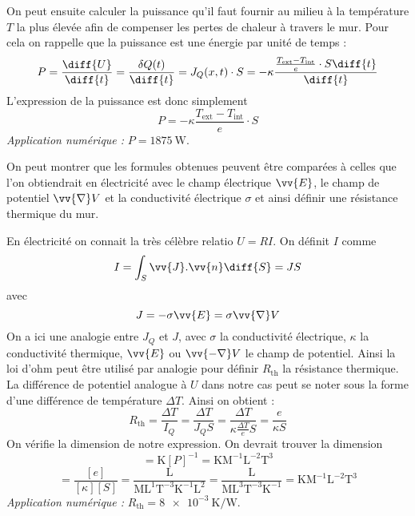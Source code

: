 \documentclass[a4paper,12pt]{article}
\begin{document}
On peut ensuite calculer la puissance qu'il faut fournir au milieu à la température $T$ la plus élevée afin de compenser les pertes de chaleur à travers le mur. Pour cela on rappelle que la puissance est une énergie par unité de temps :
\begin{equation}
	P = \frac{\diff{U}}{\diff{t}} = \frac{\delta Q(t)}{\diff{t}} = J_Q (x,t) \cdot S = - \kappa \frac{\frac{T_\text{ext} - T_\text{int}}{e} \cdot S \diff{t}}{\diff{t}}
\end{equation}
L'expression de la puissance est donc simplement
\begin{equation}
	P = - \kappa \frac{T_\text{ext} - T_\text{int}}{e} \cdot S
\end{equation}
\emph{Application numérique :} $P = \SI{1875}{\watt}$.

On peut montrer que les formules obtenues peuvent être comparées à celles que l'on obtiendrait en électricité avec le champ électrique $\vv{E}$, le champ de potentiel $\vv{\nabla} V$ et la conductivité électrique $\sigma$ et ainsi définir une \og résistance thermique \fg{} du mur.

En électricité on connait la très célèbre relatio $U=RI$. On définit $I$ comme
\begin{equation}
	I = \int_S \vv{J} . \vv{n} \diff{S} = J S
\end{equation}
avec
\begin{equation}
	J = - \sigma \vv{E} = \sigma \vv{\nabla} V
\end{equation}
On a ici une analogie entre $J_Q$ et $J$, avec $\sigma$ la conductivité électrique, $\kappa$ la conductivité thermique, $\vv{E}$ ou $\vv{- \nabla} V$ le champ de potentiel. Ainsi la loi d'ohm peut être utilisé par analogie pour définir $R_\text{th}$ la résistance thermique. La différence de potentiel analogue à $U$ dans notre cas peut se noter sous la forme d'une différence de température $\Delta T$. Ainsi on obtient :
\begin{equation}
	R_\text{th} = \frac{\Delta T}{I_Q} = \frac{\Delta T}{J_Q S} = \frac{\Delta T}{\kappa \frac{\Delta T}{e} S} = \frac{e}{\kappa S}
\end{equation}
On vérifie la dimension de notre expression. On devrait trouver la dimension
\begin{equation}
	[R] = \mathrm{K} [P]^{-1} = \mathrm{K} \mathrm{M}^{-1} \mathrm{L}^{-2} \mathrm{T}^{3}
\end{equation}
\begin{equation}
	[R] 	= \frac{[e]}{[\kappa][S]} 
		= \frac{\mathrm{L}}{\mathrm{M}\mathrm{L}^1\mathrm{T}^{-3}\mathrm{K}^{-1}  \mathrm{L}^2} 
		= \frac{\mathrm{L}}{\mathrm{M}\mathrm{L}^3\mathrm{T}^{-3}\mathrm{K}^{-1}}
		= \mathrm{K}\mathrm{M}^{-1}\mathrm{L}^{-2}\mathrm{T}^{3}
\end{equation}
\emph{Application numérique : } $R_\text{th} = \SI{8e-3}{\kelvin\per\watt}$.
\end{document}

